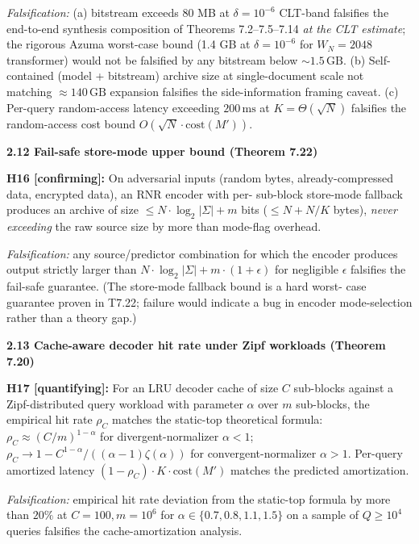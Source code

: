 \documentclass[
]{article}
\begin{document}
\emph{Falsification:} (a) bitstream exceeds 80 MB at $\delta = 10^{-6}$
CLT-band falsifies the end-to-end synthesis composition of Theorems
7.2--7.5--7.14 \emph{at the CLT estimate}; the rigorous Azuma
worst-case bound (1.4 GB at $\delta = 10^{-6}$ for $W_N = 2048$
transformer) would not be falsified by any bitstream below
$\sim 1.5\,\mathrm{GB}$. (b) Self-contained (model + bitstream)
archive size at single-document scale not matching $\approx 140\,\mathrm{GB}$
expansion falsifies the side-information framing caveat. (c) Per-query
random-access latency exceeding $200\,\mathrm{ms}$ at $K = \Theta(\sqrt{N})$
falsifies the random-access cost bound $O(\sqrt{N} \cdot \mathrm{cost}(M'))$.

\textbf{2.12 Fail-safe store-mode upper bound (Theorem 7.22)}

\textbf{H16 {[}confirming{]}:} On adversarial inputs (random bytes,
already-compressed data, encrypted data), an RNR encoder with per-
sub-block store-mode fallback produces an archive of size
$\leq N \cdot \log_2 |\Sigma| + m$ bits ($\leq N + N/K$ bytes),
\emph{never exceeding} the raw source size by more than mode-flag
overhead.

\emph{Falsification:} any source/predictor combination for which the
encoder produces output strictly larger than $N \cdot \log_2|\Sigma|
+ m \cdot (1 + \epsilon)$ for negligible $\epsilon$ falsifies the
fail-safe guarantee. (The store-mode fallback bound is a hard worst-
case guarantee proven in T7.22; failure would indicate a bug in
encoder mode-selection rather than a theory gap.)

\textbf{2.13 Cache-aware decoder hit rate under Zipf workloads
(Theorem 7.20)}

\textbf{H17 {[}quantifying{]}:} For an LRU decoder cache of size $C$
sub-blocks against a Zipf-distributed query workload with parameter
$\alpha$ over $m$ sub-blocks, the empirical hit rate $\rho_C$ matches
the static-top theoretical formula:
$\rho_C \approx (C/m)^{1-\alpha}$ for divergent-normalizer $\alpha < 1$;
$\rho_C \to 1 - C^{1-\alpha}/((\alpha-1)\zeta(\alpha))$ for
convergent-normalizer $\alpha > 1$. Per-query amortized latency
$(1-\rho_C) \cdot K \cdot \mathrm{cost}(M')$ matches the predicted
amortization.

\emph{Falsification:} empirical hit rate deviation from the static-top
formula by more than $20\%$ at $C = 100, m = 10^6$ for $\alpha \in
\{0.7, 0.8, 1.1, 1.5\}$ on a sample of $Q \geq 10^4$ queries falsifies
the cache-amortization analysis.
\end{document}
